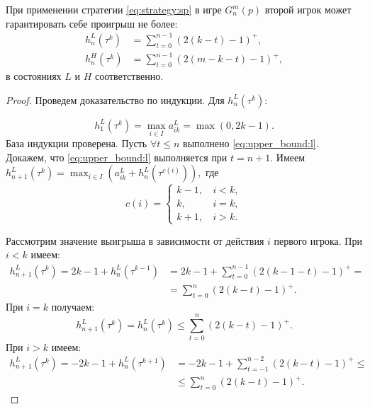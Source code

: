 \begin{utver}
При применении стратегии \eqref{eq:strategy:sp} в игре $ G_n^m(p) $ второй игрок может гарантировать себе проигрыш не более:
\begin{align}
\label{eq:upper_bound:l}
h_n^L(\tau^k) &= \sum_{t=0}^{n-1}
    (2(k - t) - 1)^+,\\
\label{eq:upper_bound:h}
h_n^H(\tau^k) &= \sum_{t=0}^{n-1}
    (2(m - k - t) - 1)^+,
\end{align}
в состояниях $ L $ и $ H $ соответственно.
\end{utver}
\begin{proof}
Проведем доказательство по индукции.
Для $ h_n^L(\tau^k) $:

\[ 
h_1^L(\tau^k) = \max_{i \in I} a_{ik}^L = \max(0, 2k - 1).
\]
База индукции проверена.
Пусть $ \forall t \leq n $ выполнено \eqref{eq:upper_bound:l}. 
Докажем, что \eqref{eq:upper_bound:l} выполняется при $ t=n+1 $. Имеем
$
h_{n+1}^L(\tau^k) = \max_{i \in I} (a_{ik}^L + h_n^L(\tau^{c(i)})),
$
где
\[ 
c(i) = \begin{cases}
    k - 1, &\, i < k, \\
    k, &\, i = k, \\
    k + 1, &\, i > k.
\end{cases}
\]

Рассмотрим значение выигрыша в зависимости от действия $ i $ первого игрока. 
При $ i < k $ имеем:
\begin{align*}
  h_{n+1}^L(\tau^k) = 2k - 1 + h_n^L(\tau^{k-1}) &= 2k - 1 + \sum_{t = 0}^{n-1} (2(k-1-t)-1)^+ = \\
  &= \sum_{t = 0}^n (2(k-t) - 1)^+.
\end{align*}
При $ i = k $ получаем:
\[
  h_{n+1}^L(\tau^k) = h_n^L(\tau^k) \leq \sum_{t=0}^n(2(k-t)-1)^+.
\]
При $ i > k $ имеем:
\begin{align*}
  h_{n+1}^L(\tau^k) = -2k - 1 + h_n^L(\tau^{k+1}) &= -2k - 1 + \sum_{t = -1}^{n-2} (2(k-t)-1)^+ \leq \\
  &\leq \sum_{t=0}^n(2(k-t)-1)^+.
\end{align*}


\end{proof}
